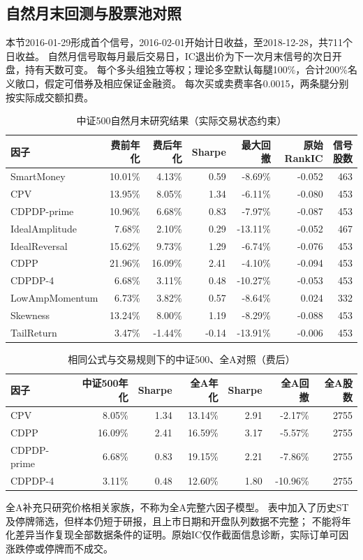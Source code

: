 \documentclass[UTF8,zihao=-4,fontset=fandol]{ctexart}
\begin{document}
\subsection{自然月末回测与股票池对照}
本节2016-01-29形成首个信号，2016-02-01开始计日收益，至2018-12-28，共711个日收益。
自然月信号取每月最后交易日，IC退出价为下一次月末信号的次日开盘，持有天数可变。
每个多头组独立等权；理论多空默认每腿100\%，合计200\%名义敞口，假定可借券及相应保证金融资。
每次买或卖费率各0.0015，两条腿分别按实际成交额扣费。

\begin{table}[H]\centering\small
\caption{中证500自然月末研究结果（实际交易状态约束）}
\setlength{\tabcolsep}{4pt}
\begin{tabular}{lrrrrrr}\toprule
因子 & 费前年化 & 费后年化 & Sharpe & 最大回撤 & 原始RankIC & 信号股数\\\midrule
SmartMoney & 10.01\% & 4.13\% & 0.59 & -8.69\% & -0.052 & 463 \\
CPV & 13.95\% & 8.05\% & 1.34 & -6.11\% & -0.080 & 453 \\
CDPDP-prime & 10.96\% & 6.68\% & 0.83 & -7.97\% & -0.087 & 453 \\
IdealAmplitude & 7.68\% & 2.10\% & 0.29 & -13.11\% & -0.052 & 467 \\
IdealReversal & 15.62\% & 9.73\% & 1.29 & -6.74\% & -0.076 & 453 \\
CDPP & 21.96\% & 16.09\% & 2.41 & -4.10\% & -0.094 & 453 \\
CDPDP-4 & 6.68\% & 3.11\% & 0.48 & -10.27\% & -0.053 & 453 \\
LowAmpMomentum & 6.73\% & 3.82\% & 0.57 & -8.64\% & 0.024 & 332 \\
Skewness & 13.24\% & 8.00\% & 1.19 & -8.29\% & -0.088 & 453 \\
TailReturn & 3.47\% & -1.44\% & -0.14 & -13.91\% & -0.006 & 453 \\
\bottomrule
\end{tabular}\end{table}

\begin{table}[H]\centering\small
\caption{相同公式与交易规则下的中证500、全A对照（费后）}
\setlength{\tabcolsep}{4pt}
\begin{tabular}{lrrrrrr}\toprule
因子 & 中证500年化 & Sharpe & 全A年化 & Sharpe & 全A回撤 & 全A股数\\\midrule
CPV & 8.05\% & 1.34 & 13.14\% & 2.91 & -2.17\% & 2755 \\
CDPP & 16.09\% & 2.41 & 16.59\% & 3.17 & -5.57\% & 2755 \\
CDPDP-prime & 6.68\% & 0.83 & 19.15\% & 2.21 & -7.86\% & 2755 \\
CDPDP-4 & 3.11\% & 0.48 & 12.60\% & 1.80 & -10.96\% & 2755 \\
\bottomrule
\end{tabular}\end{table}
全A补充只研究价格相关家族，不称为全A完整六因子模型。
表中加入了历史ST及停牌筛选，但样本仍短于研报，且上市日期和开盘队列数据不完整；
不能将年化差异当作复现全部数据条件的证明。原始IC仅作截面信息诊断，实际订单可因涨跌停或停牌而不成交。
\end{document}
